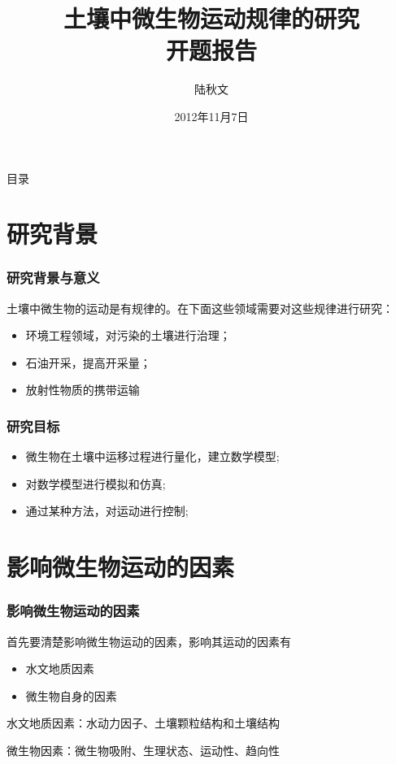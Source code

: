 \documentclass[xcolor=dvipsnames]{beamer}
\title{\kaishu 土壤中微生物运动规律的研究\\开题报告}
\author{陆秋文}
\institute[北京化工大学]{北京化工大学生命科学与技术学院}
\date{2012年11月7日}
\begin{document}
\begin{frame}
\titlepage
\end{frame}
\begin{frame}{目录}
\tableofcontents
\end{frame}
\section{研究背景}
	\begin{frame}
	\frametitle{研究背景与意义}
	土壤中微生物的运动是有规律的。在下面这些领域需要对这些规律进行研究：
	\begin{itemize}
	\fangsong
	\item 环境工程领域，对污染的土壤进行治理；
	\item 石油开采，提高开采量；
	\item 放射性物质的携带运输
	\end{itemize}
	\end{frame}
	\begin{frame}
	\frametitle{研究目标}
	\begin{itemize}
	\fangsong
	\item 微生物在土壤中运移过程进行量化，建立数学模型;
	\item 对数学模型进行模拟和仿真;
	\item 通过某种方法，对运动进行控制;
	\end{itemize}
	\end{frame}
\section{影响微生物运动的因素}
	\begin{frame}
	\frametitle{影响微生物运动的因素}
	首先要清楚影响微生物运动的因素，影响其运动的因素有
	\begin{itemize}
	\fangsong
	\item 水文地质因素
	\item 微生物自身的因素
	\end{itemize}\par
	水文地质因素：\kaishu 水动力因子、土壤颗粒结构和土壤结构\par
	\heiti 微生物因素：\kaishu 微生物吸附、生理状态、运动性、趋向性\par
	\end{frame}
\end{document}
